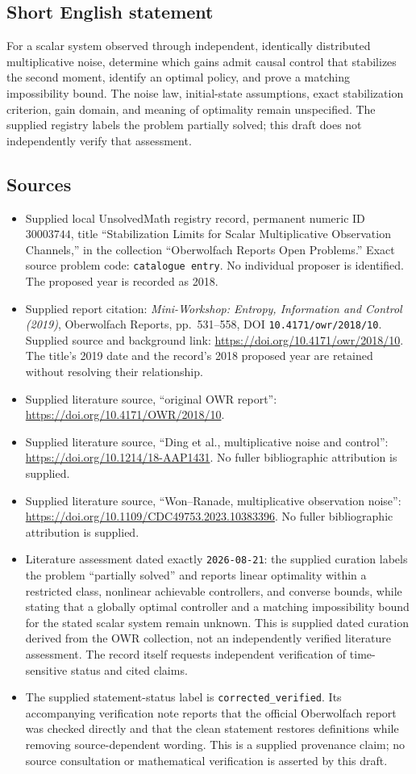 \documentclass[11pt]{article}
\begin{document}
\subsection{Short English statement}
For a scalar system observed through independent, identically distributed multiplicative noise, determine which gains admit causal control that stabilizes the second moment, identify an optimal policy, and prove a matching impossibility bound. The noise law, initial-state assumptions, exact stabilization criterion, gain domain, and meaning of optimality remain unspecified. The supplied registry labels the problem partially solved; this draft does not independently verify that assessment.
\subsection{Sources}
\begin{itemize}
\item Supplied local UnsolvedMath registry record, permanent numeric ID \(30003744\), title ``Stabilization Limits for Scalar Multiplicative Observation Channels,'' in the collection ``Oberwolfach Reports Open Problems.'' Exact source problem code: \texttt{catalogue entry}. No individual proposer is identified. The proposed year is recorded as 2018.
\item Supplied report citation: \emph{Mini-Workshop: Entropy, Information and Control (2019)}, Oberwolfach Reports, pp.~531--558, DOI \texttt{10.4171/owr/2018/10}. Supplied source and background link: \url{https://doi.org/10.4171/owr/2018/10}. The title's 2019 date and the record's 2018 proposed year are retained without resolving their relationship.
\item Supplied literature source, ``original OWR report'': \url{https://doi.org/10.4171/OWR/2018/10}.
\item Supplied literature source, ``Ding et al., multiplicative noise and control'': \url{https://doi.org/10.1214/18-AAP1431}. No fuller bibliographic attribution is supplied.
\item Supplied literature source, ``Won--Ranade, multiplicative observation noise'': \url{https://doi.org/10.1109/CDC49753.2023.10383396}. No fuller bibliographic attribution is supplied.
\item Literature assessment dated exactly \texttt{2026-08-21}: the supplied curation labels the problem ``partially solved'' and reports linear optimality within a restricted class, nonlinear achievable controllers, and converse bounds, while stating that a globally optimal controller and a matching impossibility bound for the stated scalar system remain unknown. This is supplied dated curation derived from the OWR collection, not an independently verified literature assessment. The record itself requests independent verification of time-sensitive status and cited claims.
\item The supplied statement-status label is \texttt{corrected\_verified}. Its accompanying verification note reports that the official Oberwolfach report was checked directly and that the clean statement restores definitions while removing source-dependent wording. This is a supplied provenance claim; no source consultation or mathematical verification is asserted by this draft.
\end{itemize}
\end{document}
